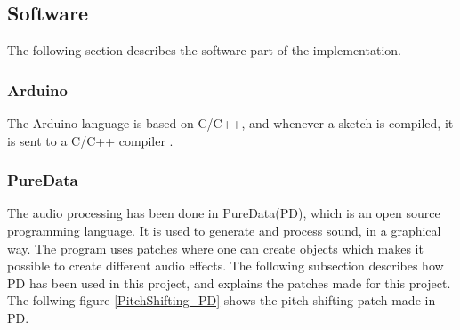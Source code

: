 \subsection{Software}

The following section describes the software part of the implementation. 

\subsubsection{Arduino}
The Arduino language is based on C/C++, and whenever a sketch is compiled, it is sent to a C/C++ compiler \citep{Arduino_FAQ}.



\subsubsection{PureData}

The audio processing has been done in PureData(PD)\citep{PD_Info}, which is an open source programming language. It is used to generate and process sound, in a graphical way. 
The program uses patches where one can create objects which makes it possible to create different audio effects. The following subsection describes how PD has been used in this project,
and explains the patches made for this project. \\

The follwing figure \ref{PitchShifting_PD} shows the pitch shifting patch made in PD. 


\begin{minipage}{\linewidth}%
\label{PitchShifting_PD}
\end{minipage}\\